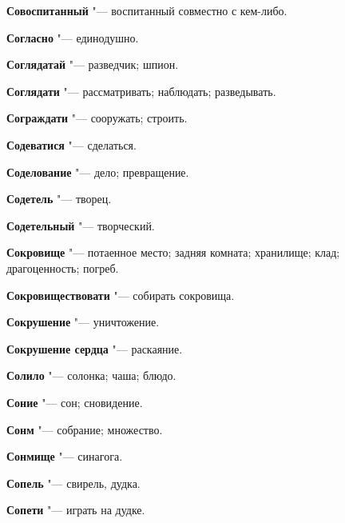 \begin{mymulticols}{2}
\noindent\textbf{Совоспитанный} "--- воспитанный совместно с кем-либо. 




\noindent\textbf{Согласно} "--- единодушно. 




\noindent\textbf{Соглядатай} "--- разведчик; шпион. 




\noindent\textbf{Соглядати} "--- рассматривать; наблюдать; разведывать. 




\noindent\textbf{Сограждати} "--- сооружать; строить. 




\noindent\textbf{Содеватися} "--- сделаться. 




\noindent\textbf{Соделование} "--- дело; превращение. 




\noindent\textbf{Содетель} "--- творец. 




\noindent\textbf{Содетельный} "--- творческий. 




\noindent\textbf{Сокровище} "--- потаенное место; задняя комната; хранилище; клад; драгоценность; погреб. 




\noindent\textbf{Сокровиществовати} "--- собирать сокровища. 




\noindent\textbf{Сокрушение} "--- уничтожение. 




\noindent\textbf{Сокрушение сердца} "--- раскаяние. 




\noindent\textbf{Солило} "--- солонка; чаша; блюдо. 




\noindent\textbf{Соние} "--- сон; сновидение. 




\noindent\textbf{Сонм} "--- собрание; множество. 




\noindent\textbf{Сонмище} "--- синагога. 




\noindent\textbf{Сопель} "--- свирель, дудка. 




\noindent\textbf{Сопети} "--- играть на дудке. 





\end{mymulticols}
